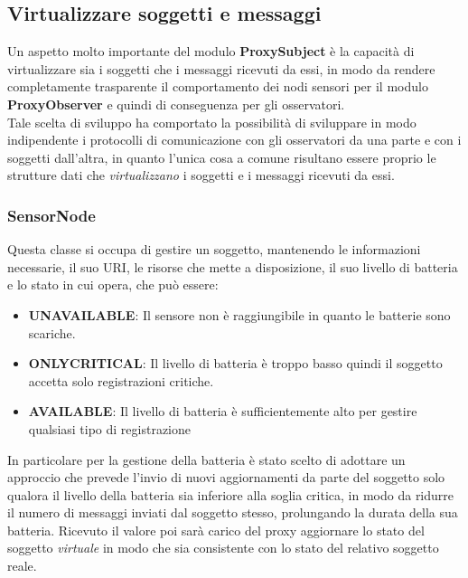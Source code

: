 \subsection{Virtualizzare soggetti e messaggi}
Un aspetto molto importante del modulo \textbf{ProxySubject} è la capacità di virtualizzare sia i soggetti che i messaggi ricevuti da essi, in modo da rendere completamente trasparente il comportamento dei nodi sensori per il modulo \textbf{ProxyObserver} e quindi di conseguenza per gli osservatori. \\
Tale scelta di sviluppo ha comportato la possibilità di sviluppare in modo indipendente i protocolli di comunicazione con gli osservatori da una parte e con i soggetti dall'altra, in quanto l'unica cosa a comune risultano essere proprio le strutture dati che \textit{virtualizzano} i soggetti e i messaggi ricevuti da essi.
\subsubsection{SensorNode}
Questa classe si occupa di gestire un soggetto, mantenendo le informazioni necessarie, il suo URI, le risorse che mette a disposizione, il suo livello di batteria e lo stato in cui opera, che può essere:
\begin{itemize}
  \item \textbf{UNAVAILABLE}: Il sensore non è raggiungibile in quanto le batterie sono scariche.
  \item \textbf{ONLYCRITICAL}: Il livello di batteria è troppo basso quindi il soggetto accetta solo registrazioni critiche.
  \item \textbf{AVAILABLE}: Il livello di batteria è sufficientemente alto per gestire qualsiasi tipo di registrazione
\end{itemize}

In particolare per la gestione della batteria è stato scelto di adottare un approccio che prevede l'invio di nuovi aggiornamenti da parte del soggetto solo qualora il livello della batteria sia inferiore alla soglia critica, in modo da ridurre il numero di messaggi inviati dal soggetto stesso, prolungando la durata della sua batteria. Ricevuto il valore poi sarà carico del proxy aggiornare lo stato del soggetto \textit{virtuale} in modo che sia consistente con lo stato del relativo soggetto reale. \\

